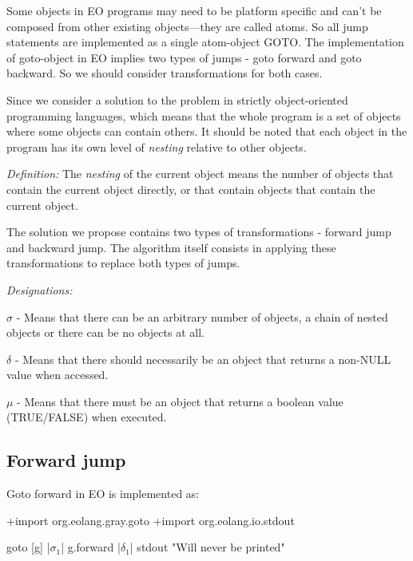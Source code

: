 \documentclass[sigplan,review,11pt,nonacm,natbib=false]{acmart}
\begin{document}
Some objects in EO programs may need to be platform specific and can’t be composed from other existing objects—they are called atoms. 
So all jump statements are implemented as a
single atom-object GOTO. The implementation of goto-object in EO implies two types of jumps - goto forward and goto backward. So we should consider transformations for both cases.

Since we consider a solution to the problem in strictly object-oriented programming languages, which means that the whole program is a set of objects where some objects can contain others.
It should be noted that each object in the program has its own level of \emph{nesting} relative to other objects.

\emph{Definition:} The \emph{nesting} of the current object means the number of objects that contain the current object directly, or that contain objects that contain the current object.

The solution we propose contains two types of transformations - forward jump and backward jump.
The algorithm itself consists in applying these transformations to replace both types of jumps.

\emph{Designations:}

$\sigma$ - Means that there can be an arbitrary number of objects, a chain of nested objects or there can be no objects at all.

$\delta$ - Means that there should necessarily be an object that returns a non-NULL value when accessed.

$\mu$ - Means that there must be an object that returns a boolean value (TRUE/FALSE) when executed.

\newcommand\sgm[1]{$\sigma_#1$}
\newcommand\dlt[1]{$\delta_#1$}
\newcommand\m[1]{$\mu_#1$}





\subsection{Forward jump}
Goto forward in EO is implemented as:

\begin{ffcode}
+import org.eolang.gray.goto
+import org.eolang.io.stdout

goto
  [g]
    |\sgm{1}|
      g.forward |\dlt{1}|
      stdout "Will never be printed"
\end{ffcode}
\end{document}
